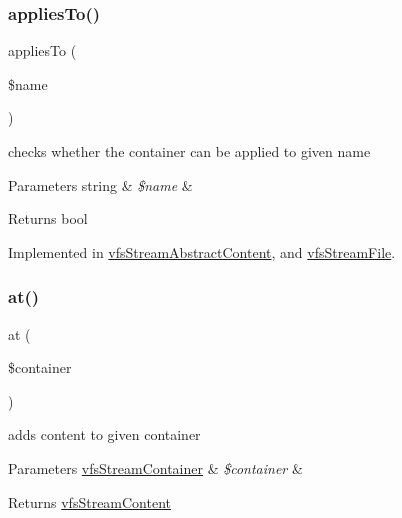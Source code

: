 \subsubsection{\texorpdfstring{applies\+To()}{appliesTo()}}
{\footnotesize\ttfamily applies\+To (\begin{DoxyParamCaption}\item[{}]{\$name }\end{DoxyParamCaption})}

checks whether the container can be applied to given name


\begin{DoxyParams}[1]{Parameters}
string & {\em \$name} & \\
\hline
\end{DoxyParams}
\begin{DoxyReturn}{Returns}
bool 
\end{DoxyReturn}


Implemented in \mbox{\hyperlink{classorg_1_1bovigo_1_1vfs_1_1vfs_stream_abstract_content_a1769b12aee6e9730bcf9b56703eb6a03}{vfs\+Stream\+Abstract\+Content}}, and \mbox{\hyperlink{classorg_1_1bovigo_1_1vfs_1_1vfs_stream_file_a1769b12aee6e9730bcf9b56703eb6a03}{vfs\+Stream\+File}}.

\mbox{\label{interfaceorg_1_1bovigo_1_1vfs_1_1vfs_stream_content_a807677a6a863886bc4aa2dbc1f473d56}} 
\subsubsection{\texorpdfstring{at()}{at()}}
{\footnotesize\ttfamily at (\begin{DoxyParamCaption}\item[{\mbox{\hyperlink{interfaceorg_1_1bovigo_1_1vfs_1_1vfs_stream_container}{vfs\+Stream\+Container}}}]{\$container }\end{DoxyParamCaption})}

adds content to given container


\begin{DoxyParams}[1]{Parameters}
\mbox{\hyperlink{interfaceorg_1_1bovigo_1_1vfs_1_1vfs_stream_container}{vfs\+Stream\+Container}} & {\em \$container} & \\
\hline
\end{DoxyParams}
\begin{DoxyReturn}{Returns}
\mbox{\hyperlink{interfaceorg_1_1bovigo_1_1vfs_1_1vfs_stream_content}{vfs\+Stream\+Content}} 
\end{DoxyReturn}


